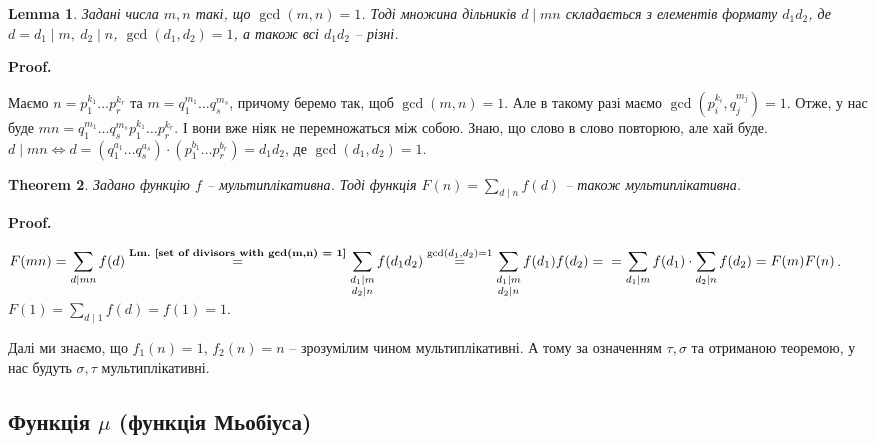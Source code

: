 \documentclass[a4paper, 10pt]{article}
\makeatletter
\theoremstyle{theoremdd}
\newtheorem{theorem}{Theorem}[subsection]
\theoremstyle{theoremdd}
\theoremstyle{theoremdd}
\theoremstyle{theoremdd}
\theoremstyle{theoremdd}
\theoremstyle{theoremdd}
\theoremstyle{theoremdd}
\newtheorem{lemma}[theorem]{Lemma}
\theoremstyle{theoremdd}
\renewenvironment{proof}[1][Proof.\\]{\par
\pushQED{\hfill \qed}%
\normalfont \topsep6\p@\@plus6\p@\relax
\trivlist
\item\relax
{\bfseries
#1\@addpunct{.}}\hspace\labelsep\ignorespaces
}{%
\popQED\endtrivlist\@endpefalse
}
\newcommand\lmref[1]{\textbf{Lm.~\ref{#1}}}
\makeatother
\begin{document}
\begin{lemma}
\label{set of divisors with gcd(m,n) = 1}
Задані числа $m,n$ такі, що $\gcd(m,n) = 1$. Тоді множина дільників $d \mid  mn$ складається з елементів формату $d_1d_2$, де $d = d_1 \mid m,\ d_2 \mid n$, $\gcd(d_1,d_2) = 1$, а також всі $d_1d_2$ -- різні.
\end{lemma}

\begin{proof}
Маємо $n = p_1^{k_1} \dots p_r^{k_r}$ та $m = q_1^{m_1} \dots q_s^{m_s}$, причому беремо так, щоб $\gcd(m,n) = 1$. Але в такому разі маємо $\gcd\left(p_i^{k_i},q_j^{m_j}\right) = 1$. Отже, у нас буде $mn = q_1^{m_1} \dots q_s^{m_s} p_1^{k_1} \dots p_r^{k_r}$. І вони вже ніяк не перемножаться між собою. Знаю, що слово в слово повторюю, але хай буде.\\
$d \mid mn \iff d = (q_1^{a_1} \dots q_s^{a_s}) \cdot (p_1^{b_1} \dots p_r^{b_r}) = d_1 d_2$, де $\gcd(d_1,d_2) = 1$.
\end{proof}

\begin{theorem}
Задано функцію $f$ -- мультиплікативна. Тоді функція $F(n) = \displaystyle\sum_{d \mid n} f(d)$ -- також мультиплікативна.
\end{theorem}

\begin{proof}
$F(mn) = \displaystyle\sum_{d \mid mn} f(d) \overset{\text{\lmref{set of divisors with gcd(m,n) = 1}}}{=} \sum_{\substack{d_1 \mid m \\ d_2 \mid n}} f(d_1 d_2) \overset{\gcd(d_1,d_2) = 1}{=} \sum_{\substack{d_1 \mid m \\ d_2 \mid n}} f(d_1) f(d_2) = \\
= \sum_{d_1 \mid m} f(d_1) \cdot \sum_{d_2 \mid n} f(d_2) = F(m) F(n)$.\\
$F(1) = \displaystyle\sum_{d \mid 1} f(d) = f(1) = 1$.
\end{proof}

Далі ми знаємо, що $f_1(n) = 1$, $f_2(n) = n$ -- зрозумілим чином мультиплікативні. А тому за означенням $\tau,\sigma$ та отриманою теоремою, у нас будуть $\sigma,\tau$ мультиплікативні.

\subsection{Функція $\mu$ (функція Мьобіуса)}
\end{document}
